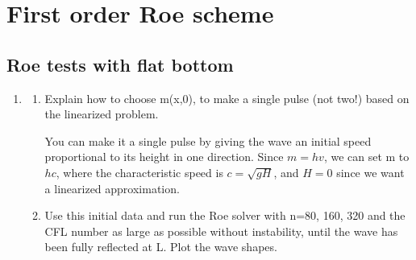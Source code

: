 
\section{First order Roe scheme} 
\subsection{Roe tests with flat bottom} %
\label{sub:roe_tests_with_flat_bottom}

\label{sec:first_order_roe_scheme} 
\begin{enumerate}
	\item 
	\begin{enumerate}
		\item Explain how to choose m(x,0), to make a single pulse (not two!) based on the linearized problem. 
		
		You can make it a single pulse by giving the wave an initial speed proportional to its height in one direction. Since $m=hv$, we can set m to $hc$, where the characteristic speed is $c=\sqrt{gH}$, and $H=0$ since we want a linearized approximation.
		
		\item Use this initial data and run the Roe solver with n=80, 160, 320 and the CFL number as large as possible without instability, until the wave has been fully reflected at L. Plot the wave shapes. 
		

\end{enumerate}
\end{enumerate}
